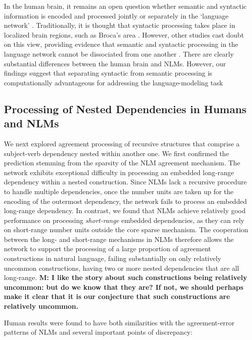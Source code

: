 In the human brain, it remains an open question whether semantic and syntactic information is encoded and processed jointly or separately in the `language network' \citep{pallier2011cortical}. Traditionally, it is thought that syntactic processing takes place in localized brain regions, such as Broca's area \citep[e.g.,][]{dapretto1999form}. However, other studies cast doubt on this view, providing evidence that semantic and syntactic processing in the language network cannot be dissociated from one another \citep{mollica2018high, siegelman2019attempt, fedorenko2020lack}. There are clearly substantial differences between the human brain and NLMs. However, our findings suggest that separating syntactic from semantic processing is computationally advantageous for addressing the language-modeling task \citep[see, e.g.,][for related studies.]{ullman2004contributions, o2006biologically, russin2019reilly} 

\subsection{Processing of Nested Dependencies in Humans and NLMs}
We next explored agreement processing of recursive structures that comprise a subject-verb dependency nested within another one. We first confirmed the prediction stemming from the sparsity of the NLM agreement mechanism. The network exhibits exceptional difficulty in processing an embedded long-range dependency within a nested construction. Since NLMs lack a recursive procedure to handle multiple dependencies, once the number units are taken up for the encoding of the outermost dependency, the network fails to process an embedded long-range dependency. In contrast, we found that NLMs achieve relatively good performance on processing \textit{short-range} embedded dependencies, as they can rely on short-range number units outside the core sparse mechanism. The cooperation between the long- and short-range mechanisms in NLMs therefore allows the network to support the processing of a large proportion of agreement constructions in natural language, failing substantially on only relatively uncommon constructions, having two or more nested dependencies that are all long-range. \textbf{M: I like the story about such constructions being relatively uncommon: but do we know that they are? If not, we should perhaps make it clear that it is our conjecture that such constructions are relatively uncommon.}

Human results were found to have both similarities with the agreement-error patterns of NLMs and several important points of discrepancy:

